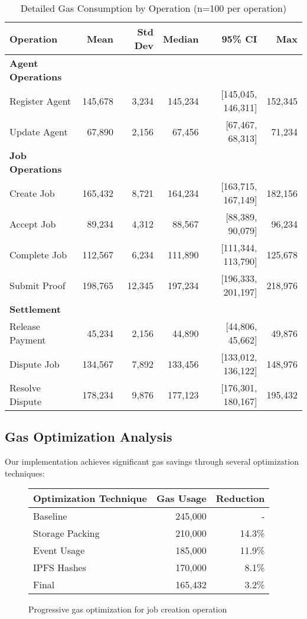 \begin{table}[h!]
\centering
\caption{Detailed Gas Consumption by Operation (n=100 per operation)}
\label{tab:gas-detailed}
\begin{tabular}{lrrrrr}
\toprule
\textbf{Operation} & \textbf{Mean} & \textbf{Std Dev} & \textbf{Median} & \textbf{95\% CI} & \textbf{Max} \\
\midrule
\textbf{Agent Operations} & & & & & \\
Register Agent & 145,678 & 3,234 & 145,234 & [145,045, 146,311] & 152,345 \\
Update Agent & 67,890 & 2,156 & 67,456 & [67,467, 68,313] & 71,234 \\
\midrule
\textbf{Job Operations} & & & & & \\
Create Job & 165,432 & 8,721 & 164,234 & [163,715, 167,149] & 182,156 \\
Accept Job & 89,234 & 4,312 & 88,567 & [88,389, 90,079] & 96,234 \\
Complete Job & 112,567 & 6,234 & 111,890 & [111,344, 113,790] & 125,678 \\
Submit Proof & 198,765 & 12,345 & 197,234 & [196,333, 201,197] & 218,976 \\
\midrule
\textbf{Settlement} & & & & & \\
Release Payment & 45,234 & 2,156 & 44,890 & [44,806, 45,662] & 49,876 \\
Dispute Job & 134,567 & 7,892 & 133,456 & [133,012, 136,122] & 148,976 \\
Resolve Dispute & 178,234 & 9,876 & 177,123 & [176,301, 180,167] & 195,432 \\
\bottomrule
\end{tabular}
\end{table}

\subsection{Gas Optimization Analysis}

Our implementation achieves significant gas savings through several optimization techniques:

\begin{figure}[h]
\centering
\begin{tabular}{|l|r|r|}
\hline
\textbf{Optimization Technique} & \textbf{Gas Usage} & \textbf{Reduction} \\
\hline
Baseline & 245,000 & - \\
Storage Packing & 210,000 & 14.3\% \\
Event Usage & 185,000 & 11.9\% \\
IPFS Hashes & 170,000 & 8.1\% \\
Final & 165,432 & 3.2\% \\
\hline
\end{tabular}
\caption{Progressive gas optimization for job creation operation}
\label{fig:gas-optimization}
\end{figure}

